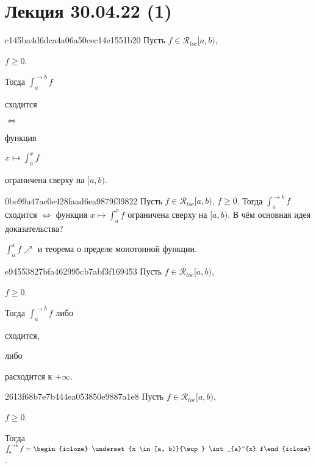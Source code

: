 \section{Лекция 30.04.22 (1)}
\begin{note}{c145ba4d6dca4a06a50cec14e1551b20}
    Пусть \({ f \in \mathcal R_{loc}[a, b) }\),\begin{icloze}{4} \({ f \geqslant 0 }\).\end{icloze}
    Тогда \({ \int_{a}^{\to b} f }\) \begin{icloze}{2}сходится\end{icloze} \begin{icloze}{3}\({ \iff }\)\end{icloze} функция \begin{icloze}{1}\({ x \mapsto \int_{a}^{x} f }\)\end{icloze} ограничена сверху на \({ [a, b) }\).
\end{note}

\begin{note}{0be99a47ac0e428faad6ea9879f39822}
    Пусть \({ f \in \mathcal R_{loc}[a, b) }\), \({ f \geqslant 0 }\).
    Тогда \({ \int_{a}^{\to b} f }\) сходится \({ \iff }\) функция \({ x \mapsto \int_{a}^{x} f }\) ограничена сверху на \({ [a, b) }\).
    В чём основная идея доказательства?

    \begin{cloze}{1}
        \({ \int_{a}^{x} f \!\!\nearrow }\) и теорема о пределе монотонной функции.
    \end{cloze}
\end{note}

\begin{note}{e94553827bfa462995cb7abf3f169453}
    Пусть \({ f \in \mathcal R_{loc}[a, b) }\), \begin{icloze}{2}\({ f \geqslant 0 }\).\end{icloze}
    Тогда \({ \int_{a}^{\to b} f }\) либо \begin{icloze}{1}сходится,\end{icloze} либо \begin{icloze}{1}расходится к \({ +\infty }\).\end{icloze}
\end{note}

\begin{note}{2613f68b7e7b444ea053850e9887a1e8}
    Пусть \({ f \in \mathcal R_{loc}[a, b) }\), \begin{icloze}{2}\({ f \geqslant 0 }\).\end{icloze}
    Тогда \({ \int_{a}^{\to b} f = \begin{icloze}{1}\underset{x \in [a, b)}{\sup} \int_{a}^{x} f\end{icloze} }\).
\end{note}

